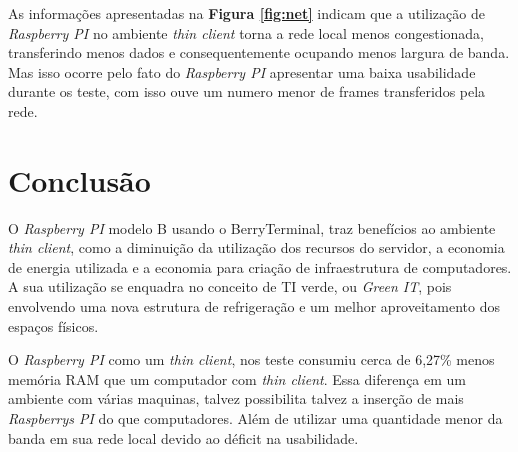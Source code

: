 \documentclass[
	12pt,				%
	openright,			%
	twoside,			%
	a4paper,			%
	chapter=TITLE,		%
	english,			%
	brazil				%
	]{abntex2}
\begin{document}
As informações apresentadas na \textbf{Figura \ref{fig:net}} indicam que a utilização de \textit{Raspberry PI} no ambiente \textit{thin client} torna a rede local menos congestionada, transferindo menos dados e consequentemente ocupando menos largura de banda. Mas isso ocorre pelo fato do \textit{Raspberry PI} apresentar uma baixa usabilidade durante os teste, com isso ouve um numero menor de frames transferidos pela rede. 









\section{Conclusão}

O \textit{Raspberry PI} modelo B usando o BerryTerminal, traz benefícios ao ambiente \textit{thin client}, como a diminuição da utilização dos recursos do servidor, a economia de energia utilizada e a economia para criação de infraestrutura de computadores. A sua utilização se enquadra no conceito de TI verde, ou \textit{Green IT}, pois envolvendo uma nova estrutura de refrigeração e um melhor aproveitamento dos espaços físicos. 

O \textit{Raspberry PI} como um \textit{thin client}, nos teste consumiu cerca de 6,27\% menos memória RAM que um computador com \textit{thin client}. Essa diferença em um ambiente com várias maquinas, talvez possibilita talvez a inserção de mais \textit{Raspberrys PI} do que computadores. Além de utilizar uma quantidade menor da banda em sua rede local devido ao déficit na usabilidade.
\end{document}
